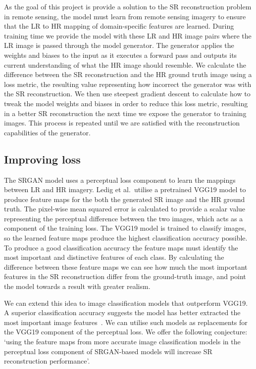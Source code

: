 As the goal of this project is provide a solution to the SR reconstruction problem in remote sensing, the model must learn from remote sensing imagery to ensure that the LR to HR mapping of domain-specific features are learned. During training time we provide the model with these LR and HR image pairs where the LR image is passed through the model generator. The generator applies the weights and biases to the input as it executes a forward pass and outputs its current understanding of what the HR image should resemble. We calculate the difference between the SR reconstruction and the HR ground truth image using a loss metric, the resulting value representing how incorrect the generator was with the SR reconstruction. We then use steepest gradient descent to calculate how to tweak the model weights and biases in order to reduce this loss metric, resulting in a better SR reconstruction the next time we expose the generator to training images. This process is repeated until we are satisfied with the reconstruction capabilities of the generator.

\subsection{Improving loss}
The SRGAN model uses a perceptual loss component to learn the mappings between LR and HR imagery. Ledig et al.\ utilise a pretrained VGG19 model to produce feature maps for the both the generated SR image and the HR ground truth. The pixel-wise mean squared error is calculated to provide a scalar value representing the perceptual difference between the two images, which acts as a component of the training loss. The VGG19 model is trained to classify images, so the learned feature maps produce the highest classification accuracy possible. To produce a good classification accuracy the feature maps must identify the most important and distinctive features of each class. By calculating the difference between these feature maps we can see how much the most important features in the SR reconstruction differ from the ground-truth image, and point the model towards a result with greater realism.

We can extend this idea to image classification models that outperform VGG19. A superior classification accuracy suggests the model has better extracted the most important image features~\cite{ref}. We can utilise such models as replacements for the VGG19 component of the perceptual loss. We offer the following conjecture: `using the feature maps from more accurate image classification models in the perceptual loss component of SRGAN-based models will increase SR reconstruction performance'.

